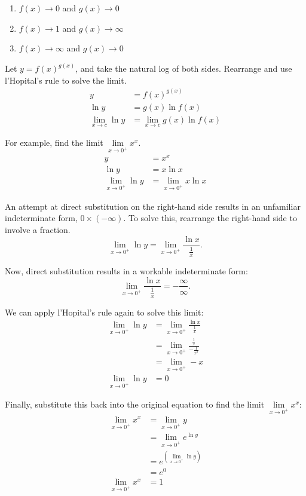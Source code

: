 \begin{enumerate}
	\item $f(x) \to 0$ and $g(x) \to 0$
	\item $f(x) \to 1$ and $g(x) \to \infty$
	\item $f(x) \to \infty$ and $g(x) \to 0$
\end{enumerate}

Let $y = f(x)^{g(x)}$, and take the natural log of both sides. Rearrange and use l'Hopital's rule to solve the limit.
\begin{align*}
	y &= f(x)^{g(x)} \\
	\ln y &= g(x) \ln f(x) \\
	\lim_{x \to c} \ln y &= \lim_{x \to c} g(x) \ln f(x)
\end{align*}

\noindent For example, find the limit $\lim \limits_{x \to 0^+} x^x$.
\begin{align*}
	y &= x^x \\
	\ln y &= x \ln x \\
	\lim_{x \to 0^+} \ln y &= \lim_{x \to 0^+} x \ln x
\end{align*}

\noindent An attempt at direct substitution on the right-hand side results in an unfamiliar indeterminate form, $0 \times (- \infty)$. To solve this, rearrange the right-hand side to involve a fraction.
\[ \lim_{x \to 0^+} \ln y = \lim_{x \to 0^+} \frac{\ln x}{\frac{1}{x}}. \]

\noindent Now, direct substitution results in a workable indeterminate form:
\[ \lim_{x \to 0^+} \frac{\ln x}{\frac{1}{x}} = -\frac{\infty}{\infty}. \]

\noindent We can apply l'Hopital's rule again to solve this limit:
\begin{align*}
	\lim_{x \to 0^+} \ln y &= \lim_{x \to 0^+} \frac{\ln x}{\frac{1}{x}} \\[5pt]
	&= \lim_{x \to 0^+} \frac{\frac{1}{x}}{-\frac{1}{x^2}} \\[5pt]
	&= \lim_{x \to 0^+} -x \\
	\lim_{x \to 0^+} \ln y &= 0
\end{align*}

\noindent Finally, substitute this back into the original equation to find the limit $\lim \limits_{x \to 0^+} x^x$:
\begin{align*}
	\lim_{x \to 0^+} x^x &= \lim_{x \to 0^+} y \\
	&= \lim_{x \to 0^+} e^{\ln y} \\
	&= e^{\left( \lim \limits_{x \to 0^+} \ln y \right)} \\
	&= e^0 \\
	\lim_{x \to 0^+} x^x &= 1
\end{align*}

